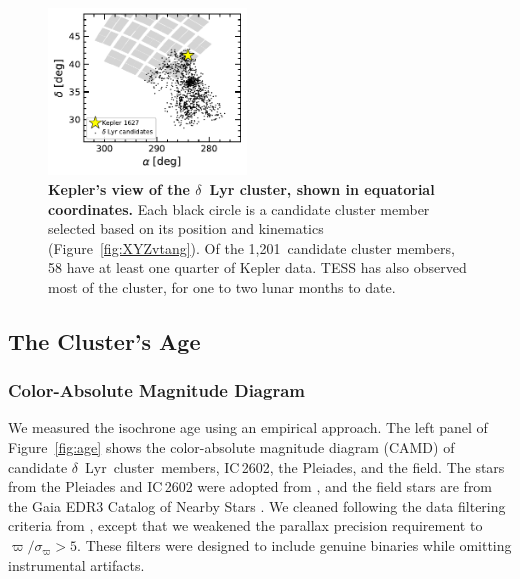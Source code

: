 \documentclass[12pt,modern,twocolumn,tighten,linenumbers]{aastex63}
\newcommand{\cn}{$\delta$\ Lyr\ cluster} %
\newcommand{\nkinematic}{1{,}201} %
\begin{document}
\begin{figure}[t]
	\begin{center}
		\leavevmode
		\includegraphics[width=0.47\textwidth]{f2.pdf}
	\end{center}
	\vspace{-0.7cm}
	\caption{
    {\bf Kepler's view of the $\delta$~Lyr cluster, shown in equatorial
    	coordinates.} Each black circle
    is a candidate cluster member selected based on its position and kinematics (Figure~\ref{fig:XYZvtang}).  Of
    the \nkinematic\ candidate cluster members, 58 have at least one
    quarter of Kepler data.  TESS has also observed most of the
    cluster, for one to two lunar months to date.
		\label{fig:skychart}
	}
\end{figure}


\subsection{The Cluster's Age}
\label{sec:clusterage}


\subsubsection{Color-Absolute Magnitude Diagram}
\label{sec:camd}

We measured the isochrone age using an empirical approach.  The left
panel of Figure~\ref{fig:age} shows the color-absolute magnitude
diagram (CAMD) of candidate \cn\ members, IC\,2602, the Pleiades, and
the field. The stars from the Pleiades and IC\,2602 were adopted from
\citet{CantatGaudin2018a}, and the field stars are from the Gaia EDR3
Catalog of Nearby Stars \citep{gaia_gcns_2021}. We cleaned 
following the data filtering criteria from \citet[][Appendix
B]{GaiaCollaboration2018}, except that we weakened the parallax
precision requirement to $\varpi/\sigma_\varpi>5$.   These filters were
designed to include genuine binaries while omitting instrumental
artifacts.  
\end{document}
